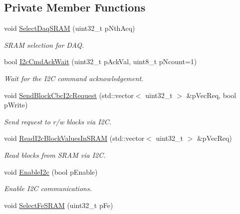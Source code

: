 \subsection*{Private Member Functions}
\begin{DoxyCompactItemize}
\item 
void \hyperlink{class_ph2___hw_interface_1_1_glib_f_w_interface_a0b6b576606e87a52598c3dd3b314c62e}{Select\-Daq\-S\-R\-A\-M} (uint32\-\_\-t p\-Nth\-Acq)
\begin{DoxyCompactList}\small\item\em S\-R\-A\-M selection for D\-A\-Q. \end{DoxyCompactList}\item 
bool \hyperlink{class_ph2___hw_interface_1_1_glib_f_w_interface_aa43ddde3db1e03ed001bda27a2acf7e1}{I2c\-Cmd\-Ack\-Wait} (uint32\-\_\-t p\-Ack\-Val, uint8\-\_\-t p\-Ncount=1)
\begin{DoxyCompactList}\small\item\em Wait for the I2\-C command acknowledgement. \end{DoxyCompactList}\item 
void \hyperlink{class_ph2___hw_interface_1_1_glib_f_w_interface_a17a0f55fc06cc6f0b334f7debcf733d3}{Send\-Block\-Cbc\-I2c\-Request} (std\-::vector$<$ uint32\-\_\-t $>$ \&p\-Vec\-Req, bool p\-Write)
\begin{DoxyCompactList}\small\item\em Send request to r/w blocks via I2\-C. \end{DoxyCompactList}\item 
void \hyperlink{class_ph2___hw_interface_1_1_glib_f_w_interface_ae067b85741fbb52c30a946d5f4f2691b}{Read\-I2c\-Block\-Values\-In\-S\-R\-A\-M} (std\-::vector$<$ uint32\-\_\-t $>$ \&p\-Vec\-Req)
\begin{DoxyCompactList}\small\item\em Read blocks from S\-R\-A\-M via I2\-C. \end{DoxyCompactList}\item 
void \hyperlink{class_ph2___hw_interface_1_1_glib_f_w_interface_abb8f5593c61f54a35a2a7f99b3d6ca55}{Enable\-I2c} (bool p\-Enable)
\begin{DoxyCompactList}\small\item\em Enable I2\-C communications. \end{DoxyCompactList}\item 
void \hyperlink{class_ph2___hw_interface_1_1_glib_f_w_interface_ad7974fd2dee37135dc6cc3997d083037}{Select\-Fe\-S\-R\-A\-M} (uint32\-\_\-t p\-Fe)
\end{DoxyCompactItemize}
